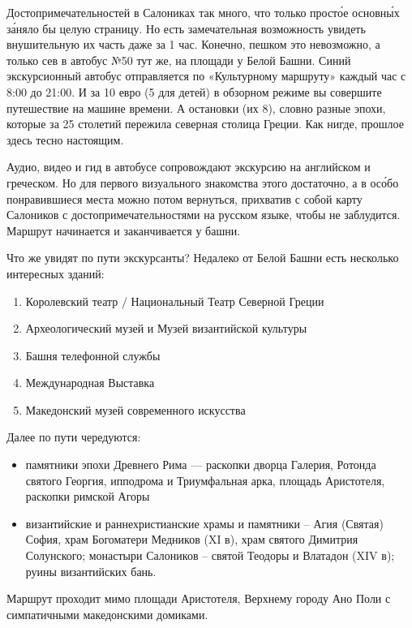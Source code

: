 Достопримечательностей в Салониках так много, что только прост\'{о}е  основн\'{ы}х з\'{а}няло бы целую страницу. Но есть замечательная возможность увидеть внушительную их часть даже за 1 час. Конечно, пешком это невозможно, а только сев в автобус №50 тут же, на площади у Белой Башни. Синий экскурсионный автобус отправляется по «Культурному маршруту» каждый час с 8:00 до 21:00. И за 10 евро (5 для детей) в обзорном режиме вы совершите путешествие на машине времени. А остановки (их 8), словно разные эпохи, которые за 25 столетий пережила северная столица Греции. Как нигде, прошлое здесь тесно  настоящим.

Аудио, видео и гид в автобусе сопровождают экскурсию на английском и греческом. Но для первого визуального знакомства этого достаточно, а в ос\'{о}бо понравившиеся места можно потом вернуться, прихватив с собой карту Салоников с достопримечательностями на русском языке, чтобы не заблудится. Маршрут начинается и заканчивается у башни.

Что же увидят по пути экскурсанты? Недалеко от Белой Башни есть несколько интересных зданий:
\begin{enumerate}
    \item Королевский театр / Национальный Театр Северной Греции
    \item Археологический музей и Музей византийской культуры
    \item Башня телефонной службы
    \item Международная Выставка
    \item Македонский музей современного искусства
\end{enumerate}
Далее по пути чередуются:
\begin{itemize}
    \item памятники эпохи Древнего Рима — раскопки дворца Галерия, Ротонда святого Георгия,  ипподрома и Триумфальная арка, площадь Аристотеля, раскопки римской Агоры
    \item византийские и раннехристианские храмы и памятники – Агия (Святая) София, храм Богоматери Медников (XI в), храм святого Димитрия Солунского; монастыри Салоников – святой Теодоры и Влатадон (XIV в); руины византийских бань.
\end{itemize}

Маршрут проходит мимо площади Аристотеля, Верхнему городу Ано Поли с симпатичными  македонскими домиками.

